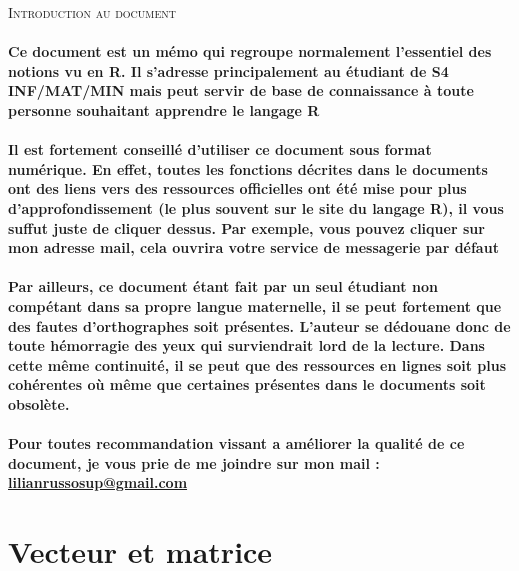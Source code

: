 \documentclass{article}
\begin{document}
\newpage

\begin{center}
    \textsc{\huge Introduction au document}\\[2cm]
\end{center} 

\paragraph{Ce document est un mémo qui regroupe normalement l'essentiel des notions vu en R. Il s'adresse principalement au étudiant de S4 INF/MAT/MIN mais peut servir de base de connaissance à toute personne souhaitant apprendre le langage R}

\paragraph{Il est fortement conseillé d'utiliser ce document sous format numérique. En effet, toutes les fonctions décrites dans le documents ont des liens vers des ressources officielles ont été mise pour plus d'approfondissement (le plus souvent sur le site du langage R), il vous suffut juste de cliquer dessus. Par exemple, vous pouvez cliquer sur mon adresse mail, cela ouvrira votre service de messagerie par défaut}

\paragraph{Par ailleurs, ce document étant fait par un seul étudiant non compétant dans sa propre langue maternelle, il se peut fortement que des fautes d'orthographes soit présentes. L'auteur se dédouane donc de toute hémorragie des yeux qui surviendrait lord de la lecture. Dans cette même continuité, il se peut que des ressources en lignes soit plus cohérentes où même que certaines présentes dans le documents soit obsolète.}

\paragraph{Pour toutes recommandation vissant a améliorer la qualité de ce document, je vous prie de me joindre sur mon mail : \href{mailto:lilianrussosup@gmail.com}{lilianrussosup@gmail.com}}

\newpage

\hspace{3cm}

\tableofcontents

\newpage
\section{Vecteur et matrice}
\end{document}
